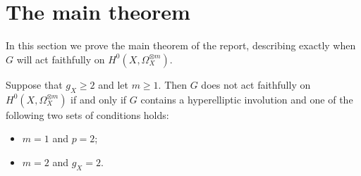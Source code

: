 \newpage

\section{The main theorem}\label{maintheoremsection}
In this section we prove the main theorem of the report, describing exactly when $G$ will act faithfully on $H^0(X,\Omega_X^{\otimes m})$.


\begin{unnumthm}
Suppose that $g_X\geq 2$ and let $m\geq1$. 
Then $G$ does not act faithfully on $H^0(X,\Omega_X^{\otimes m})$ if and only if $G$ contains a hyperelliptic involution and one of the following two sets of conditions holds:
\begin{itemize}
\item $m=1$ and $p=2$;
\item $m=2$ and $g_X=2$.
\end{itemize}
\end{unnumthm}

